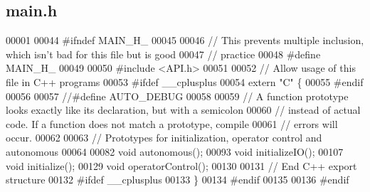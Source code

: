 \subsection{main.\+h}
\label{main_8h_source}

\begin{DoxyCode}
00001 
00044 \textcolor{preprocessor}{#ifndef MAIN\_H\_}
00045 
00046 \textcolor{comment}{// This prevents multiple inclusion, which isn't bad for this file but is good}
00047 \textcolor{comment}{// practice}
00048 \textcolor{preprocessor}{#define MAIN\_H\_}
00049 
00050 \textcolor{preprocessor}{#include <API.h>}
00051 
00052 \textcolor{comment}{// Allow usage of this file in C++ programs}
00053 \textcolor{preprocessor}{#ifdef \_\_cplusplus}
00054 \textcolor{keyword}{extern} \textcolor{stringliteral}{"C"} \{
00055 \textcolor{preprocessor}{#endif}
00056 
00057 \textcolor{comment}{//#define AUTO\_DEBUG}
00058 
00059 \textcolor{comment}{// A function prototype looks exactly like its declaration, but with a semicolon}
00060 \textcolor{comment}{// instead of actual code. If a function does not match a prototype, compile}
00061 \textcolor{comment}{// errors will occur.}
00062 
00063 \textcolor{comment}{// Prototypes for initialization, operator control and autonomous}
00064 
00082 \textcolor{keywordtype}{void} autonomous();
00093 \textcolor{keywordtype}{void} initializeIO();
00107 \textcolor{keywordtype}{void} initialize();
00129 \textcolor{keywordtype}{void} operatorControl();
00130 
00131 \textcolor{comment}{// End C++ export structure}
00132 \textcolor{preprocessor}{#ifdef \_\_cplusplus}
00133 \}
00134 \textcolor{preprocessor}{#endif}
00135 
00136 \textcolor{preprocessor}{#endif}
\end{DoxyCode}
